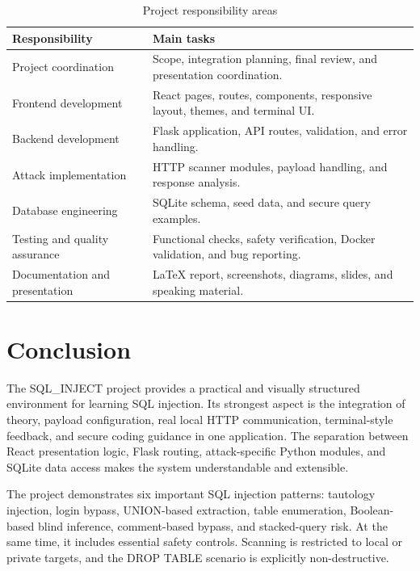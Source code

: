 \documentclass[12pt,a4paper]{article}
\newcommand{\projectname}{SQL\_INJECT}
\begin{document}
\begin{table}[H]
\centering
\caption{Project responsibility areas}
\label{tab:team-responsibilities}
\begin{tabularx}{\textwidth}{p{4cm}X}
\toprule
Responsibility & Main tasks \\
\midrule
Project coordination & Scope, integration planning, final review, and presentation coordination. \\
Frontend development & React pages, routes, components, responsive layout, themes, and terminal UI. \\
Backend development & Flask application, API routes, validation, and error handling. \\
Attack implementation & HTTP scanner modules, payload handling, and response analysis. \\
Database engineering & SQLite schema, seed data, and secure query examples. \\
Testing and quality assurance & Functional checks, safety verification, Docker validation, and bug reporting. \\
Documentation and presentation & LaTeX report, screenshots, diagrams, slides, and speaking material. \\
\bottomrule
\end{tabularx}
\end{table}

\section{Conclusion}

The \projectname{} project provides a practical and visually structured environment for learning SQL injection. Its strongest aspect is the integration of theory, payload configuration, real local HTTP communication, terminal-style feedback, and secure coding guidance in one application. The separation between React presentation logic, Flask routing, attack-specific Python modules, and SQLite data access makes the system understandable and extensible.

The project demonstrates six important SQL injection patterns: tautology injection, login bypass, UNION-based extraction, table enumeration, Boolean-based blind inference, comment-based bypass, and stacked-query risk. At the same time, it includes essential safety controls. Scanning is restricted to local or private targets, and the DROP TABLE scenario is explicitly non-destructive.
\end{document}
